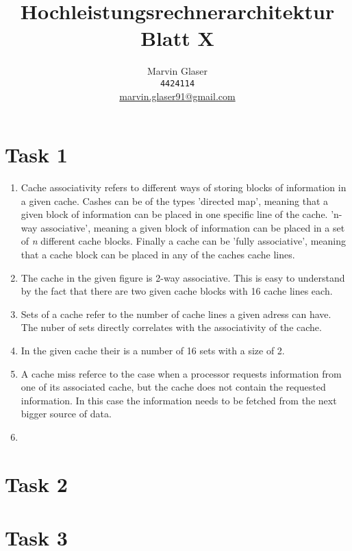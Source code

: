 \documentclass{article}
\title{Hochleistungsrechnerarchitektur Blatt X}
\author{
Marvin Glaser \\ \texttt{4424114} \\ \href{mailto:marvin.glaser91@gmail.com}{marvin.glaser91@gmail.com}
}
\begin{document}
\maketitle



\section{Task 1}

\begin{enumerate}[label=(\alph*)]
	
\item Cache associativity refers to different ways of storing blocks of  information in a given cache.
	Cashes can be of the types 'directed map', meaning that a given block of information 
	can be placed in one specific line of the cache. 'n-way associative', meaning a given
	block of information can be placed in a set of \textit{n} different cache blocks. Finally a
	cache can be 'fully associative', meaning that a cache block can be placed in any of the
	caches cache lines.
	
\item The cache in the given figure is 2-way associative. This is easy to understand by the fact
	that there are two given cache blocks with 16 cache lines each.

\item Sets of a cache refer to the number of cache lines a given adress can have. The nuber of sets
	directly correlates with the associativity of the cache. 

\item In the given cache their is a number of 16 sets with a size of 2.

\item A cache miss referce to the case when a processor requests information from one of its
	associated cache, but the cache does not contain the requested information. In this case
	the information needs to be fetched from the next bigger source of data.

\item 
	
\end{enumerate}



\section{Task 2}





\section{Task 3}
\end{document}
